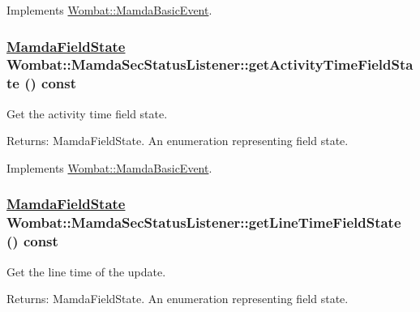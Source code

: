 Implements \hyperlink{classWombat_1_1MamdaBasicEvent_9cd58f3d7b5ebea42fa86e5dde46ab18}{Wombat::Mamda\-Basic\-Event}.\hypertarget{classWombat_1_1MamdaSecStatusListener_5c7ee86111027d782bc1477700a78224}{
\subsubsection[getActivityTimeFieldState]{\setlength{\rightskip}{0pt plus 5cm}\hyperlink{namespaceWombat_93aac974f2ab713554fd12a1fa3b7d2a}{Mamda\-Field\-State} Wombat::Mamda\-Sec\-Status\-Listener::get\-Activity\-Time\-Field\-State () const}}
\label{classWombat_1_1MamdaSecStatusListener_5c7ee86111027d782bc1477700a78224}


Get the activity time field state. 

\begin{Desc}
\item[Returns:]Mamda\-Field\-State. An enumeration representing field state. \end{Desc}


Implements \hyperlink{classWombat_1_1MamdaBasicEvent_a61a566e3442181ca1fadc4524296cd0}{Wombat::Mamda\-Basic\-Event}.\hypertarget{classWombat_1_1MamdaSecStatusListener_3772a00bb836461eb5dac1a57631b000}{
\subsubsection[getLineTimeFieldState]{\setlength{\rightskip}{0pt plus 5cm}\hyperlink{namespaceWombat_93aac974f2ab713554fd12a1fa3b7d2a}{Mamda\-Field\-State} Wombat::Mamda\-Sec\-Status\-Listener::get\-Line\-Time\-Field\-State () const}}
\label{classWombat_1_1MamdaSecStatusListener_3772a00bb836461eb5dac1a57631b000}


Get the line time of the update. 

\begin{Desc}
\item[Returns:]Mamda\-Field\-State. An enumeration representing field state. \end{Desc}


